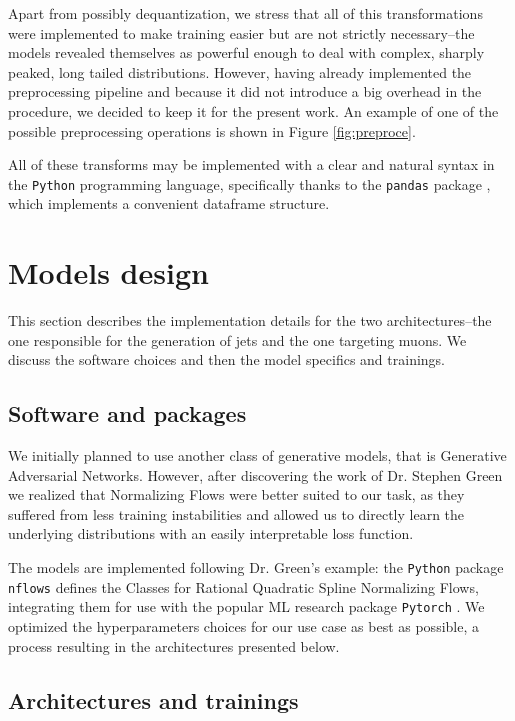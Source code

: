 Apart from possibly dequantization, we stress that all of this transformations were implemented to make training easier but are not strictly necessary--the models revealed themselves as powerful enough to deal with complex, sharply peaked, long tailed distributions. However, having already implemented the preprocessing pipeline and because it did not introduce a big overhead in the procedure, we decided to keep it for the present work. An example of one of the possible preprocessing operations is shown in Figure \ref{fig:preproce}.

All of these transforms may be implemented with a clear and natural syntax in the \texttt{Python} programming language, specifically thanks to the \texttt{pandas} package \cite{reback2020pandas}, which implements a convenient dataframe structure.

\section{Models design}
This section describes the implementation  details for the two architectures--the one responsible for the generation of jets and the one targeting muons. We discuss the software choices and then the model specifics and trainings.

\subsection{Software and packages}

We initially planned to use another class of generative models, that is Generative Adversarial Networks. However, after discovering the work of Dr. Stephen Green \cite{stephen_green_2021_4558988} we realized that Normalizing Flows were better suited to our task, as they suffered from less training instabilities and allowed us to directly learn the underlying distributions with an easily interpretable loss function.

The models are implemented following Dr. Green's example: the \texttt{Python} package \texttt{nflows} \cite{conor_durkan_2020_4296287} defines the Classes for Rational Quadratic Spline Normalizing Flows, integrating them for use with the popular ML research package \texttt{Pytorch} \cite{NEURIPS2019_9015}. We optimized the hyperparameters choices for our use case as best as possible, a process resulting in the architectures presented below.

\subsection{Architectures and trainings}

